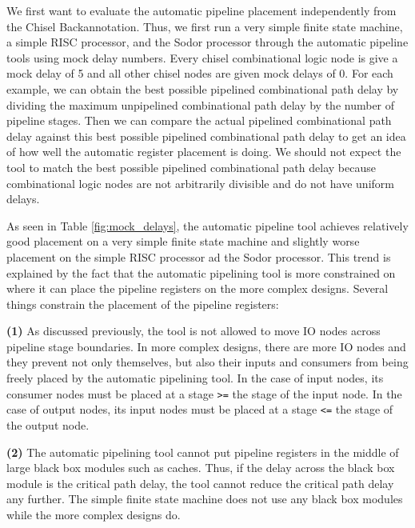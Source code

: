 
We first want to evaluate the automatic pipeline placement independently from the Chisel Backannotation. Thus, we first run a very simple finite state machine, a simple RISC processor, and the Sodor processor through the automatic pipeline tools using mock delay numbers. Every chisel combinational logic node is give a mock delay of 5 and all other chisel nodes are given mock delays of 0. For each example, we can obtain the best possible pipelined combinational path delay by dividing the maximum unpipelined combinational path delay by the number of pipeline stages. Then we can compare the actual pipelined combinational path delay against this best possible pipelined combinational path delay to get an idea of how well the automatic register placement is doing. We should not expect the tool to match the best possible pipelined combinational path delay because combinational logic nodes are not arbitrarily divisible and do not have uniform delays.

As seen in Table \ref{fig:mock_delays}, the automatic pipeline tool achieves relatively good  placement on a very simple finite state machine and slightly worse placement on the simple RISC processor ad the Sodor processor. This trend is explained by the fact that the automatic pipelining tool is more constrained on where it can place the pipeline registers on the more complex designs. Several things constrain the placement of the pipeline registers:

{\bf (1)} 
As discussed previously, the tool is not allowed to move IO nodes across pipeline stage boundaries. In more complex designs, there are more IO nodes and they prevent not only themselves, but also their inputs and consumers from being freely placed by the automatic pipelining tool. In the case of input nodes, its consumer nodes must be placed at a stage {\tt >=} the stage of the input node. In the case of output nodes, its input nodes must be placed at a stage {\tt <=} the stage of the output node.

{\bf (2)}  
The automatic pipelining tool cannot put pipeline registers in the middle of large black box modules such as caches. Thus, if the delay across the black box module is the critical path delay, the tool cannot reduce the critical path delay any further. The simple finite state machine does not use any black box modules while the more complex designs do.

